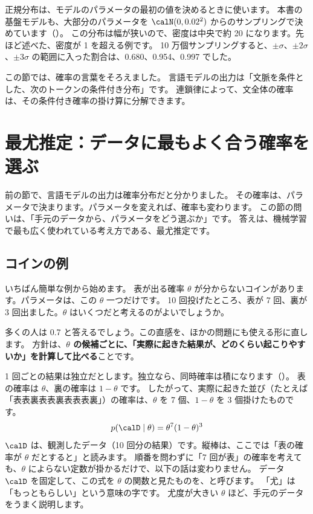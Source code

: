 正規分布は、モデルのパラメータの最初の値を決めるときに使います。
本書の基盤モデルも、大部分のパラメータを $\calN(0,0.02^{2})$ からのサンプリングで決めています（）。
この分布は幅が狭いので、密度は中央で約 20 になります。先ほど述べた、密度が 1 を超える例です。
10 万個サンプリングすると、$\pm\sigma$、$\pm 2\sigma$、$\pm 3\sigma$ の範囲に入った割合は、0.680、0.954、0.997 でした。

この節では、確率の言葉をそろえました。
言語モデルの出力は「文脈を条件とした、次のトークンの条件付き分布」です。
連鎖律によって、文全体の確率は、その条件付き確率の掛け算に分解できます。

\section{最尤推定：データに最もよく合う確率を選ぶ}\label{sec:math-mle}

前の節で、言語モデルの出力は確率分布だと分かりました。
その確率は、パラメータで決まります。パラメータを変えれば、確率も変わります。
この節の問いは、「手元のデータから、パラメータをどう選ぶか」です。
答えは、機械学習で最も広く使われている考え方である、最尤推定です。

\subsection*{コインの例}

いちばん簡単な例から始めます。
表が出る確率 $\theta$ が分からないコインがあります。パラメータは、この $\theta$ 一つだけです。
10 回投げたところ、表が 7 回、裏が 3 回出ました。$\theta$ はいくつだと考えるのがよいでしょうか。

多くの人は 0.7 と答えるでしょう。この直感を、ほかの問題にも使える形に直します。
方針は、\textbf{$\theta$ の候補ごとに、「実際に起きた結果が、どのくらい起こりやすいか」を計算して比べる}ことです。

1 回ごとの結果は独立だとします。独立なら、同時確率は積になります（）。
表の確率は $\theta$、裏の確率は $1-\theta$ です。
したがって、実際に起きた並び（たとえば「表表裏表表裏表表表裏」）の確率は、$\theta$ を 7 個、$1-\theta$ を 3 個掛けたものです。
\begin{equation}
p(\calD\mid\theta)=\theta^{7}(1-\theta)^{3}
\label{eq:math-likelihood}
\end{equation}
$\calD$ は、観測したデータ（10 回分の結果）です。縦棒は、ここでは「表の確率が $\theta$ だとすると」と読みます。
順番を問わずに「7 回が表」の確率を考えても、$\theta$ によらない定数が掛かるだけで、以下の話は変わりません。
データ $\calD$ を固定して、この式を $\theta$ の関数と見たものを、と呼びます。
「尤」は「もっともらしい」という意味の字です。
尤度が大きい $\theta$ ほど、手元のデータをうまく説明します。

